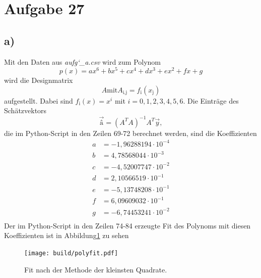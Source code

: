 \section*{Aufgabe 27}
\label{sec:Aufgabe4}

\subsection*{a)}
Mit den Daten aus \textit{aufg\char`_a.csv} wird zum Polynom
\begin{equation}
p(x)=ax^6+bx^5+cx^4+dx^3+ex^2+fx+g\label{eq:p}
\end{equation}
wird die Designmatrix 
\[
A \text{mit} A_\text{i,j}=f_\text{i}(x_\text{j})
\]
aufgestellt. Dabei sind $f_\text{i}(x)=x^i$ mit $i=0,1,2,3,4,5,6$.
Die Einträge des Schätzvektors
\[
\vec{â}=(A^TA)^{-1}A^T\vec{y},
\]
die im Python-Script in den Zeilen 69-72 berechnet werden, sind die Koeffizienten
\begin{align*}
a &= -1,96288194\cdot 10^{-4}\\
b &= 4,78568044\cdot 10^{-3}\\
c &= -4,52007747\cdot 10^{-2}\\
d &= 2,10566519\cdot 10^{-1}\\
e &= -5,13748208\cdot 10^{-1}\\
f &= 6,09609032\cdot 10^{-1}\\
g &= -6,74453241\cdot 10^{-2}\\
\end{align*}
Der im Python-Script in den Zeilen 74-84 erzeugte Fit des Polynoms mit diesen Koeffizienten ist in Abbildung\ref{fig:polyfit} zu sehen
\begin{figure}
\centering
\texttt{[image: build/polyfit.pdf]}
\caption{Fit nach der Methode der kleinsten Quadrate.}
\label{fig:polyfit}
\end{figure}

